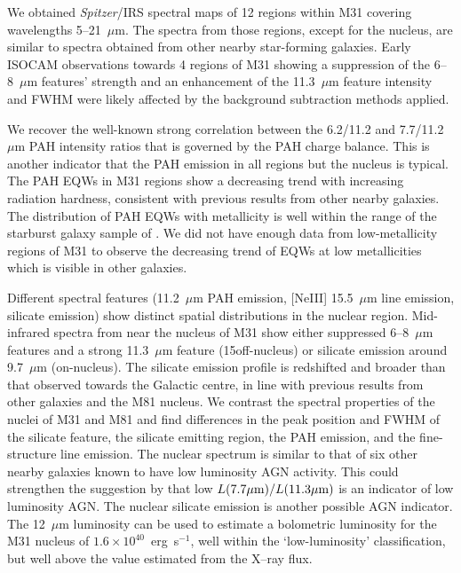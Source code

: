 We  obtained {\em Spitzer}/IRS spectral maps of 12 regions within M31 covering wavelengths 5--21~$\mu$m. 
The spectra from those regions, except for the nucleus, are similar to spectra obtained from other nearby  star-forming galaxies. 
Early  ISOCAM observations towards 4 regions of M31 showing a suppression 
of the 6--8~$\mu$m features' strength and an enhancement of  the 11.3~$\mu$m feature intensity and FWHM \citep{1998Cesarsky} were likely affected by the background subtraction methods applied.

We recover the well-known strong correlation between the 6.2/11.2 and 7.7/11.2 $\mu$m PAH intensity ratios that is governed by the PAH charge balance.  This is another indicator that the PAH emission in all regions but the nucleus is typical. The PAH EQWs in M31 regions show a decreasing trend with increasing radiation hardness, consistent with previous 
results from other nearby galaxies. The distribution of PAH EQWs with metallicity is well within the range of the starburst galaxy sample of \citet{Engelbracht_2008}. 
We did not have enough data from low-metallicity regions of M31 to observe the decreasing trend of EQWs at low metallicities which is visible in other galaxies.

Different spectral features (11.2~$\mu$m PAH emission, [NeIII] 15.5~$\mu$m line emission, silicate emission) show distinct spatial distributions in the nuclear region. Mid-infrared spectra from near the nucleus of M31 show either suppressed 6--8~$\mu$m features and a strong 11.3~$\mu$m feature
(15\arcsec off-nucleus) or silicate emission around 9.7~$\mu$m  (on-nucleus). The silicate emission profile is redshifted and broader than that observed towards the Galactic centre, in line with previous results from other galaxies and the M81 nucleus.  We contrast the spectral properties of the nuclei of M31 and M81 and find differences in the peak position and FWHM of the silicate feature, the silicate emitting region, the PAH emission, and the fine-structure line emission. 
The nuclear spectrum is similar to that of six other nearby galaxies known to have low luminosity AGN activity. This could strengthen the
suggestion by \citet{Smith:2007lr} that low $L(7.7\mu{\rm m})/L(11.3\mu{\rm m})$ is an indicator of low luminosity AGN. 
The nuclear silicate emission is another possible AGN indicator.
The 12~$\mu$m luminosity can be used to estimate a bolometric luminosity for the M31 nucleus of $1.6\times 10^{40}$~erg~s$^{-1}$,
well within the `low-luminosity' classification, but well above the value estimated from the X--ray flux.
